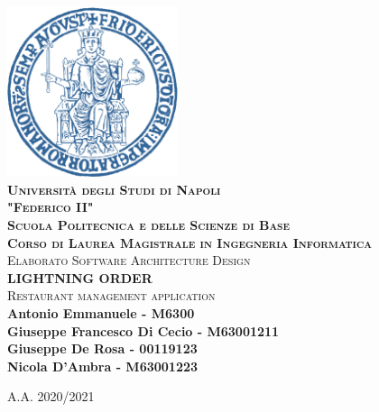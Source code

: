 \begin{titlepage}

\newcommand{\HRule}{\rule{\linewidth}{0.3mm}}
\center

\includegraphics[width=50mm]{logo_unina.png}\\
\vfill
\textsc{\LARGE \bfseries Università degli Studi di Napoli \\"Federico II"}\\[0.7cm] %
\textsc{\large \bfseries Scuola Politecnica e delle Scienze di Base}\\
\textsc{\large \bfseries Corso di Laurea Magistrale in Ingegneria Informatica}\\
\vfill
\textsc{\large Elaborato Software Architecture Design} \\[0.6cm]
\textbf{\Large LIGHTNING ORDER}\\[0.2cm]
\textsc{\large Restaurant management application}\\
\vfill
\bfseries{\large
Antonio Emmanuele - M6300\\
Giuseppe Francesco Di Cecio - M63001211\\
Giuseppe De Rosa - 00119123\\
Nicola D'Ambra - M63001223\\[0.5cm]
}

\vfill
{\text \large A.A. 2020/2021}
\end{titlepage}
